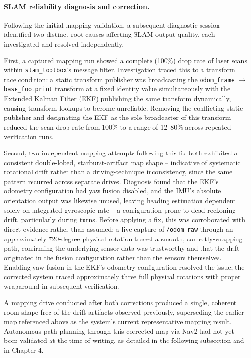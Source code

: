 \paragraph{SLAM reliability diagnosis and correction.}
\label{sec:slam_reliability_fixes}
Following the initial mapping validation, a subsequent diagnostic session
identified two distinct root causes affecting SLAM output quality, each
investigated and resolved independently.

First, a captured mapping run showed a complete (100\%) drop rate of laser scans
within \texttt{slam\_toolbox}'s message filter. Investigation traced this to a
transform race condition: a static transform publisher was broadcasting the
\texttt{odom\_frame} $\to$ \texttt{base\_footprint} transform at a fixed identity
value simultaneously with the Extended Kalman Filter (EKF) publishing the same
transform dynamically, causing transform lookups to become unreliable. Removing
the conflicting static publisher and designating the EKF as the sole broadcaster
of this transform reduced the scan drop rate from 100\% to a range of 12--80\%
across repeated verification runs.

Second, two independent mapping attempts following this fix both exhibited a
consistent double-lobed, starburst-artifact map shape -- indicative of systematic
rotational drift rather than a driving-technique inconsistency, since the same
pattern recurred across separate drives. Diagnosis found that the EKF's odometry
configuration had yaw fusion disabled, and the IMU's absolute orientation output
was likewise unused, leaving heading estimation dependent solely on integrated
gyroscopic rate -- a configuration prone to dead-reckoning drift, particularly
during turns. Before applying a fix, this was corroborated with direct evidence
rather than assumed: a live capture of \texttt{/odom\_raw} through an approximately
720-degree physical rotation traced a smooth, correctly-wrapping path, confirming
the underlying sensor data was trustworthy and that the drift originated in the
fusion configuration rather than the sensors themselves. Enabling yaw fusion in
the EKF's odometry configuration resolved the issue; the corrected system traced
approximately three full physical rotations with proper wraparound in subsequent
verification.

A mapping drive conducted after both corrections produced a single, coherent room
shape free of the drift artifacts observed previously, superseding the earlier
map referenced above as the system's current representative mapping result.
Autonomous path planning through this corrected map via Nav2 had not yet been
validated at the time of writing, as detailed in the following subsection and in
Chapter 4.

